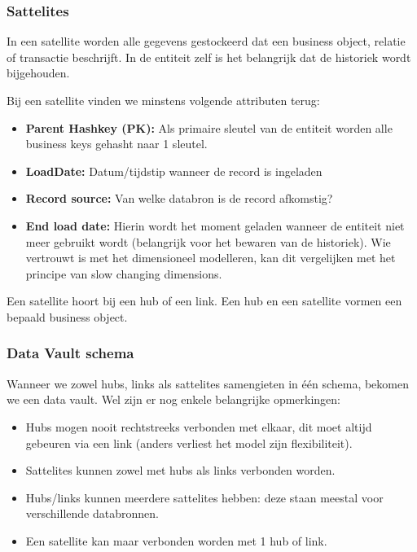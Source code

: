 \subsubsection{Sattelites}
In een satellite worden alle gegevens gestockeerd dat een business object, relatie of transactie beschrijft. In de entiteit zelf is het belangrijk dat de historiek wordt bijgehouden. \autocite{Linstedt2016}

Bij een satellite vinden we minstens volgende attributen terug:

\begin{itemize}
	\item \textbf{Parent Hashkey (PK):} Als primaire sleutel van de entiteit worden alle business keys gehasht naar 1 sleutel.
	\item \textbf{LoadDate:} Datum/tijdstip wanneer de record is ingeladen
	\item \textbf{Record source:} Van welke databron is de record afkomstig?
	\item \textbf{End load date:} Hierin wordt het moment geladen wanneer de entiteit niet meer gebruikt wordt (belangrijk voor het bewaren van de historiek). Wie vertrouwt is met het dimensioneel modelleren, kan dit vergelijken met het principe van slow changing dimensions.
\end{itemize} 

Een satellite hoort bij een hub of een link. Een hub en een satellite vormen een bepaald business object. 

\subsubsection{Data Vault schema}
Wanneer we zowel hubs, links als sattelites samengieten in één schema, bekomen we een data vault. Wel zijn er nog enkele belangrijke opmerkingen:

\begin{itemize}
	\item Hubs mogen nooit rechtstreeks verbonden met elkaar, dit moet altijd gebeuren via een link (anders verliest het model zijn flexibiliteit).
	\item Sattelites kunnen zowel met hubs als links verbonden worden.
	\item Hubs/links kunnen meerdere sattelites hebben: deze staan meestal voor verschillende databronnen.
	\item Een satellite kan maar verbonden worden met 1 hub of link. 
\end{itemize} 


